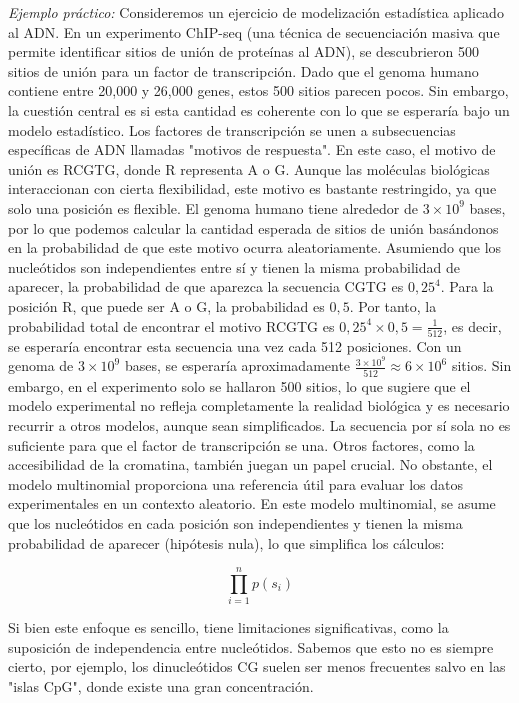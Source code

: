 \textit{Ejemplo práctico:}
Consideremos un ejercicio de modelización estadística aplicado al ADN. En un experimento ChIP-seq (una técnica de secuenciación masiva que permite identificar sitios de unión de proteínas al ADN), se descubrieron 500 sitios de unión para un factor de transcripción. Dado que el genoma humano contiene entre 20,000 y 26,000 genes, estos 500 sitios parecen pocos. Sin embargo, la cuestión central es si esta cantidad es coherente con lo que se esperaría bajo un modelo estadístico.
Los factores de transcripción se unen a subsecuencias específicas de ADN llamadas "motivos de respuesta". En este caso, el motivo de unión es RCGTG, donde R representa A o G. Aunque las moléculas biológicas interaccionan con cierta flexibilidad, este motivo es bastante restringido, ya que solo una posición es flexible. El genoma humano tiene alrededor de $3 \times 10^9$ bases, por lo que podemos calcular la cantidad esperada de sitios de unión basándonos en la probabilidad de que este motivo ocurra aleatoriamente.
Asumiendo que los nucleótidos son independientes entre sí y tienen la misma probabilidad de aparecer, la probabilidad de que aparezca la secuencia CGTG es $0,25^4$. Para la posición R, que puede ser A o G, la probabilidad es $0,5$. Por tanto, la probabilidad total de encontrar el motivo RCGTG es $0,25^4 \times 0,5 = \frac{1}{512}$, es decir, se esperaría encontrar esta secuencia una vez cada 512 posiciones. Con un genoma de $3 \times 10^9$ bases, se esperaría aproximadamente $\frac{3 \times 10^9}{512} \approx 6 \times 10^6$ sitios. Sin embargo, en el experimento solo se hallaron 500 sitios, lo que sugiere que el modelo experimental no refleja completamente la realidad biológica y es necesario recurrir a otros modelos, aunque sean simplificados.
La secuencia por sí sola no es suficiente para que el factor de transcripción se una. Otros factores, como la accesibilidad de la cromatina, también juegan un papel crucial. No obstante, el modelo multinomial proporciona una referencia útil para evaluar los datos experimentales en un contexto aleatorio.
En este modelo multinomial, se asume que los nucleótidos en cada posición son independientes y tienen la misma probabilidad de aparecer (hipótesis nula), lo que simplifica los cálculos:

 $$ \prod_{i=1}^{n} p(s_i) $$

Si bien este enfoque es sencillo, tiene limitaciones significativas, como la suposición de independencia entre nucleótidos. Sabemos que esto no es siempre cierto, por ejemplo, los dinucleótidos CG suelen ser menos frecuentes salvo en las "islas CpG", donde existe una gran concentración.

